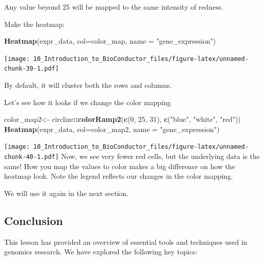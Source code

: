 \documentclass[
]{book}
\newenvironment{Shaded}{\begin{snugshade}}{\end{snugshade}}
\newcommand{\AttributeTok}[1]{\textcolor[rgb]{0.13,0.29,0.53}{#1}}
\newcommand{\DecValTok}[1]{\textcolor[rgb]{0.00,0.00,0.81}{#1}}
\newcommand{\FunctionTok}[1]{\textcolor[rgb]{0.13,0.29,0.53}{\textbf{#1}}}
\newcommand{\NormalTok}[1]{#1}
\newcommand{\OtherTok}[1]{\textcolor[rgb]{0.56,0.35,0.01}{#1}}
\newcommand{\SpecialCharTok}[1]{\textcolor[rgb]{0.81,0.36,0.00}{\textbf{#1}}}
\newcommand{\StringTok}[1]{\textcolor[rgb]{0.31,0.60,0.02}{#1}}
\begin{document}
Any value beyond 25 will be mapped to the same intensity of redness.

Make the heatmap:

\begin{Shaded}
\begin{Highlighting}[]
\FunctionTok{Heatmap}\NormalTok{(expr\_data, }\AttributeTok{col=}\NormalTok{color\_map, }\AttributeTok{name =} \StringTok{"gene\_expression"}\NormalTok{)}
\end{Highlighting}
\end{Shaded}

\texttt{[image: 10\_Introduction\_to\_BioConductor\_files/figure-latex/unnamed-chunk-39-1.pdf]}

By default, it will cluster both the rows and columns.

Let's see how it looks if we change the color mapping

\begin{Shaded}
\begin{Highlighting}[]
\NormalTok{color\_map2}\OtherTok{\textless{}{-}}\NormalTok{ circlize}\SpecialCharTok{::}\FunctionTok{colorRamp2}\NormalTok{(}\FunctionTok{c}\NormalTok{(}\DecValTok{0}\NormalTok{, }\DecValTok{25}\NormalTok{, }\DecValTok{31}\NormalTok{), }\FunctionTok{c}\NormalTok{(}\StringTok{"blue"}\NormalTok{, }\StringTok{"white"}\NormalTok{, }\StringTok{"red"}\NormalTok{))}
\FunctionTok{Heatmap}\NormalTok{(expr\_data, }\AttributeTok{col=}\NormalTok{color\_map2, }\AttributeTok{name =} \StringTok{"gene\_expression"}\NormalTok{)}
\end{Highlighting}
\end{Shaded}

\texttt{[image: 10\_Introduction\_to\_BioConductor\_files/figure-latex/unnamed-chunk-40-1.pdf]}
Now, we see very fewer red cells, but the underlying data is the same! How you map the values to color makes a big difference on how the heatmap look. Note the legend reflects our changes in the color mapping.

We will use it again in the next section.

\hypertarget{conclusion-29}{%
\subsection{Conclusion}\label{conclusion-29}}

This lesson has provided an overview of essential tools and techniques used in genomics research. We have explored the following key topics:
\end{document}
